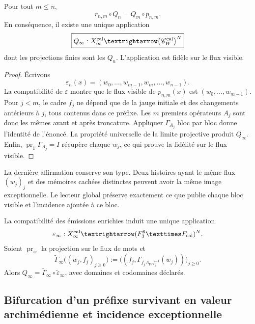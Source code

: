 \begin{theorem}
\label{p12-83-c17-s2:thm:lector-excepcional-global-rev6}
\label{thm:lector-excepcional-global-rev6}
Pour tout \(m\leq n\),
\[
\boxed{r_{n,m}\circ Q_n=Q_m\circ p_{n,m}.}
\]
En conséquence, il existe une unique application
\[
\boxed{
Q_\infty:X_\infty^{\rm cal}
\longrightarrow
\bigl(\mathscr C_W^{\rm cal}\bigr)^{\mathbb N}}
\]
dont les projections finies sont les \(Q_n\). L'application est fidèle sur le
flux visible.
\end{theorem}

\begin{proof}
Écrivons
\[
\varepsilon_n(x)
=(w_0,\ldots,w_{m-1},w_m,\ldots,w_{n-1}).
\]
La compatibilité de \(\varepsilon\) montre que le flux visible de
\(p_{n,m}(x)\) est \((w_0,\ldots,w_{m-1})\). Pour \(j<m\), le cadre
\(f_j\) ne dépend que de la jauge initiale et des changements antérieurs à
\(j\), tous contenus dans ce préfixe. Les \(m\) premiers opérateurs
\(A_j\) sont donc les mêmes avant et après troncature. Appliquer
\(\Gamma_{A_j}\) bloc par bloc donne l'identité de l'énoncé. La propriété
universelle de la limite projective produit \(Q_\infty\). Enfin,
\(\operatorname{pr}_1\Gamma_{A_j}=I\) récupère chaque \(w_j\), ce qui prouve
la fidélité sur le flux visible.
\end{proof}

La dernière affirmation conserve son type. Deux histoires ayant le même flux
\((w_j)_j\) et des mémoires cachées distinctes peuvent avoir la même image
exceptionnelle. Le lecteur global préserve exactement ce que publie chaque bloc
visible et l'incidence ajoutée à ce bloc.

La compatibilité des émissions enrichies induit une unique application
\[
 \widetilde\varepsilon_\infty:X_\infty^{\rm cal}
 \longrightarrow
 (\mathbb F_3^6\times\mathcal F_{\rm cal})^{\mathbb N}.
\]
Soient \(\operatorname{pr}_w\) la projection sur le flux de mots et
\[
 \widetilde\Gamma_\infty
 \bigl((w_j,f_j)_{j\ge0}\bigr)
 :=\bigl(
   (f_j,\Gamma_{f_jA_Wf_j^{-1}}(w_j))
 \bigr)_{j\ge0}.
\]
Alors
\(Q_\infty=\widetilde\Gamma_\infty
\circ\widetilde\varepsilon_\infty\), avec domaines et codomaines déclarés.

\subsection{Bifurcation d'un préfixe survivant en valeur archimédienne et incidence exceptionnelle}

